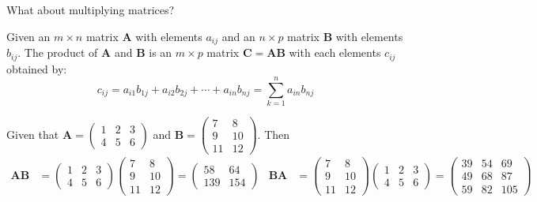 \documentclass{huhtakm-template-book}
\begin{document}
What about multiplying matrices?
\begin{defn}
    Given an $m\times n$ matrix $\mathbf{A}$ with elements $a_{ij}$ and an $n\times p$ matrix $\mathbf{B}$ with elements $b_{ij}$. The product of $\mathbf{A}$ and $\mathbf{B}$ is an $m\times p$ matrix $\mathbf{C}=\mathbf{AB}$ with each elements $c_{ij}$ obtained by:
    \begin{equation*}
        c_{ij}=a_{i1}b_{1j}+a_{i2}b_{2j}+\cdots+a_{in}b_{nj}=\sum_{k=1}^{n}a_{in}b_{nj}
    \end{equation*}
\end{defn}
\begin{eg}
    Given that $\mathbf{A}=\begin{pmatrix}
        1 & 2 & 3\\
        4 & 5 & 6
    \end{pmatrix}$ and $\mathbf{B}=\begin{pmatrix}
        7 & 8\\
        9 & 10\\
        11 & 12
    \end{pmatrix}$. Then
    \begin{align*}
        \mathbf{AB}&=\begin{pmatrix}
            1 & 2 & 3\\
            4 & 5 & 6
        \end{pmatrix}\begin{pmatrix}
            7 & 8\\
            9 & 10\\
            11 & 12
        \end{pmatrix}=\begin{pmatrix}
            58 & 64\\
            139 & 154
        \end{pmatrix} & \mathbf{BA}&=\begin{pmatrix}
            7 & 8\\
            9 & 10\\
            11 & 12
        \end{pmatrix}\begin{pmatrix}
            1 & 2 & 3\\
            4 & 5 & 6
        \end{pmatrix}=\begin{pmatrix}
            39 & 54 & 69\\
            49 & 68 & 87\\
            59 & 82 & 105
        \end{pmatrix}
    \end{align*}
\end{eg}
\end{document}
